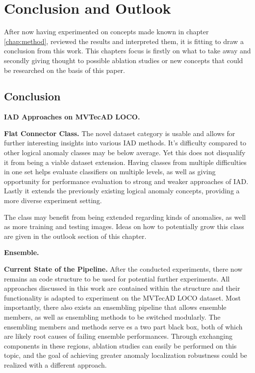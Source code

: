 \chapter{Conclusion and Outlook}
\label{chap:conclusion}


After now having experimented on concepts made known in chapter \ref{chap:method}, reviewed the results and interpreted them, it is 
fitting to draw a conclusion from this work. This chapters focus is firstly on what to take away and secondly giving thought to 
possible ablation studies or new concepts that could be researched on the basis of this paper.


\section{Conclusion}
\label{sec:realconclusion}

\textbf{IAD Approaches on MVTecAD LOCO.}

\textbf{Flat Connector Class.}
The novel dataset category is usable and allows for further interesting insights into various IAD methods. It's difficulty compared to other logical anomaly classes may be 
below average. Yet this does not disqualify it from being a viable dataset extension. Having classes from multiple difficulties in one set helps evaluate classifiers on 
multiple levels, as well as giving opportunity for performance evaluation to strong and weaker approaches of IAD. Lastly it extends the previously existing logical anomaly 
concepts, providing a more diverse experiment setting. \newline

The class may benefit from being extended regarding kinds of anomalies, as well as more training and testing images. Ideas on how to potentially grow this class are given 
in the outlook section of this chapter.

\textbf{Ensemble.}

\textbf{Current State of the Pipeline.}
After the conducted experiments, there now remains an code structure to be used for potential further experiments. 
All approaches discussed in this work are contained within the structure and their functionality is adapted to experiment on the MVTecAD LOCO \cite{LOCODentsAndScratchesBergmann2022} dataset. Most 
importantly, there also exists an ensembling pipeline that allows ensemble members, as well as ensembling methods to be switched modularly. The ensembling members and methods 
serve es a two part black box, both of which are likely root causes of failing ensemble performances. 
Through exchanging components in these regions, ablation studies can easily be performed on this topic, and the goal of achieving greater anomaly localization robustness 
could be realized with a different approach.



